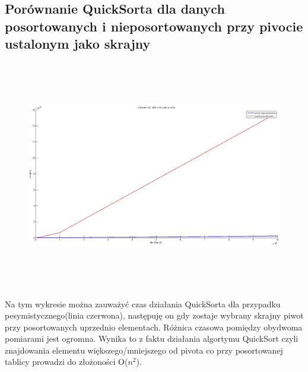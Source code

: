 \documentclass[a4paper,11pt]{article}
\begin{document}
\subsection{Porównanie QuickSorta dla danych posortowanych i nieposortowanych przy pivocie ustalonym jako skrajny}
\begin{center}
\begin{figure}[h!]
\includegraphics[width=12.5cm,height=10cm]{Wykresy2/QuickPosortowana_NieposBezPivota}
\end{figure}
\end{center}
Na tym wykresie można zauważyć czas działania QuickSorta dla przypadku pesymistycznego(linia czerwona), następuję on gdy zostaje wybrany skrajny piwot przy posortowanych uprzednio elementach. Różnica czasowa pomiędzy obydwoma pomiarami jest ogromna. Wynika to z faktu działania algortymu QuickSort czyli znajdowania elementu większego/mniejszego od pivota co przy posortowanej tablicy prowadzi do złożoności O($n^{2}$). 
\newpage
\end{document}
